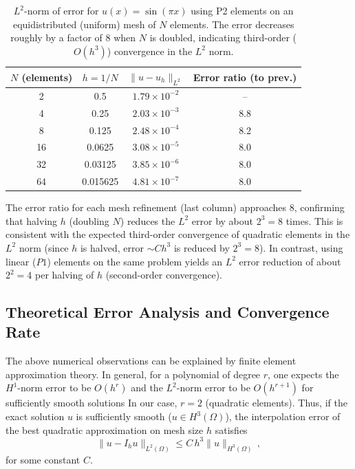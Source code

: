 \documentclass[a4paper,10pt]{article}
\begin{document}
\begin{table}[h]
	\centering
	\begin{tabular}{|c|c|c|c|}
		\hline
		$N$ (elements) & $h=1/N$  & $\|u - u_h\|_{L^2}$  & Error ratio (to prev.) \\
		\hline
		2              & 0.5      & $1.79\times 10^{-2}$ & --                     \\
		4              & 0.25     & $2.03\times 10^{-3}$ & 8.8                    \\
		8              & 0.125    & $2.48\times 10^{-4}$ & 8.2                    \\
		16             & 0.0625   & $3.08\times 10^{-5}$ & 8.0                    \\
		32             & 0.03125  & $3.85\times 10^{-6}$ & 8.0                    \\
		64             & 0.015625 & $4.81\times 10^{-7}$ & 8.0                    \\
		\hline
	\end{tabular}
	\caption{$L^2$-norm of error for $u(x)=\sin(\pi x)$ using P2 elements on an equidistributed (uniform) mesh of $N$ elements. The error decreases roughly by a factor of 8 when $N$ is doubled, indicating third-order ($O(h^3)$) convergence in the $L^2$ norm.}
	\label{tab:convergence}
\end{table}

The error ratio for each mesh refinement (last column) approaches 8, confirming that halving $h$ (doubling $N$) reduces the $L^2$ error by about $2^3=8$ times.
This is consistent with the expected third-order convergence of quadratic elements in the $L^2$ norm (since $h$ is halved, error $\sim Ch^3$ is reduced by $2^3=8$).
In contrast, using linear ($P1$) elements on the same problem yields an $L^2$ error reduction of about $2^2=4$ per halving of $h$ (second-order convergence).

\subsection{Theoretical Error Analysis and Convergence Rate}

The above numerical observations can be explained by finite element approximation theory.
In general, for a polynomial of degree $r$, one expects the $H^1$-norm error to be $O(h^r)$ and the $L^2$-norm error to be $O(h^{r+1})$ for sufficiently smooth solutions
In our case, $r=2$ (quadratic elements).
Thus, if the exact solution $u$ is sufficiently smooth ($u \in H^3(\Omega)$), the interpolation error of the best quadratic approximation on mesh size $h$ satisfies
$$ \|u - I_h u\|_{L^2(\Omega)} \le C\,h^3 \|u\|_{H^3(\Omega)}\, ,$$
for some constant $C$.
\end{document}
